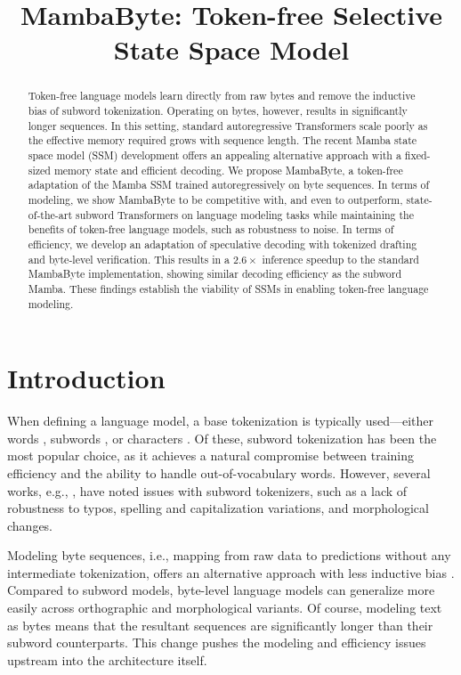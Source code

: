 \title{MambaByte: Token-free Selective State Space Model}

\begin{abstract}
Token-free language models learn directly from raw bytes and remove the inductive bias of subword tokenization. Operating on bytes, however, results in significantly longer sequences. In this setting, standard autoregressive Transformers scale poorly as the effective memory required grows with sequence length. The recent Mamba state space model (SSM) development offers an appealing alternative approach with a fixed-sized memory state and efficient decoding. We propose MambaByte, a token-free adaptation of the Mamba SSM trained autoregressively on byte sequences. In terms of modeling, we show MambaByte to be competitive with, and even to outperform, state-of-the-art subword Transformers on language modeling tasks while maintaining the benefits of token-free language models, such as robustness to noise. In terms of efficiency, we develop an adaptation of speculative decoding with tokenized drafting and byte-level verification. This results in a $2.6\times$ inference speedup to the standard MambaByte implementation, showing similar decoding efficiency as the subword Mamba. These findings establish the viability of SSMs in enabling token-free language modeling.
\end{abstract}

\section{Introduction}
\label{sec:intro}

When defining a language model, a base tokenization is typically used---either words \citep{bengio2000neural}, subwords \citep{schuster2012japanese,sennrich2015neural,wu2016google,wang2020neural}, or characters \citep{gao2020character}. Of these, subword tokenization has been the most popular choice, as it achieves a natural compromise between training efficiency and the ability to handle out-of-vocabulary words. However, several works, e.g., \citet{xue2022byt5}, have noted issues with subword tokenizers, such as a lack of robustness to typos, spelling and capitalization variations, and morphological changes.

Modeling byte sequences, i.e., mapping from raw data to predictions without any intermediate tokenization, offers an alternative approach with less inductive bias \citep{choe2019bridging,alrfou2019character,clark2022canine,tay2022charformer,xue2022byt5, yu2023megabyte}. Compared to subword models, byte-level language models can generalize more easily across orthographic and morphological variants. Of course, modeling text as bytes means that the resultant sequences are significantly longer than their subword counterparts. This change pushes the modeling and efficiency issues upstream into the architecture itself.

